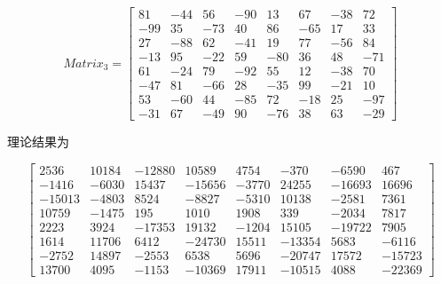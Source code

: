 \documentclass[UTF8]{ctexart}
\begin{document}
\begin{equation}
Matrix_3
=
\left[
\begin{array}{cccccccc}
    81 & -44 & 56 & -90 &  13 & 67 & -38 &  72\\
   -99 &  35 &-73 &  40 &  86 &-65 &  17 &  33\\
    27 & -88 & 62 & -41 &  19 & 77 & -56 &  84\\
   -13 &  95 &-22 &  59 & -80 & 36 &  48 & -71\\
    61 & -24 & 79 & -92 &  55 & 12 & -38 &  70\\
   -47 &  81 &-66 &  28 & -35 & 99 & -21 &  10\\
    53 & -60 & 44 & -85 &  72 &-18 &  25 & -97\\
   -31 &  67 &-49 &  90 & -76 & 38 &  63 & -29
\end{array}
\right]
\end{equation}

理论结果为

\begin{equation}
\left[
\begin{array}{cccccccc}
    2536  &  10184 & -12880 &  10589 &  4754  & -370   & -6590  &  467   \\
   -1416  & -6030  &  15437 & -15656 & -3770  &  24255 & -16693 &  16696 \\
   -15013 & -4803  &  8524  & -8827  & -5310  &  10138 & -2581  &  7361  \\
    10759 & -1475  &  195   &  1010  &  1908  &  339   & -2034  &  7817  \\
    2223  &  3924  & -17353 &  19132 & -1204  &  15105 & -19722 &  7905  \\
    1614  &  11706 &  6412  & -24730 &  15511 & -13354 &  5683  & -6116  \\
   -2752  &  14897 & -2553  &  6538  &  5696  & -20747 &  17572 & -15723 \\
    13700 &  4095  & -1153  & -10369 &  17911 & -10515 &  4088  & -22369
\end{array}
\right]
\end{equation}
\end{document}
